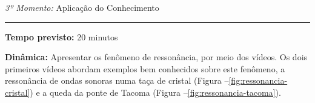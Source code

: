 
    \bigskip
    \noindent\emph{3º Momento:} Aplicação do Conhecimento
    \par\noindent\rule{.3\textwidth}{.5pt}  
    \par\noindent\textbf{Tempo previsto:} 20 minutos
    \smallskip
    \par\noindent\textbf{Dinâmica:} Apresentar os fenômeno de ressonância, por meio dos vídeos. Os dois primeiros vídeos abordam exemplos bem conhecidos sobre este fenômeno, a ressonância de ondas sonoras numa taça de cristal (Figura --\autoref{fig:ressonancia-cristal}) e a queda da ponte de Tacoma (Figura --\autoref{fig:ressonancia-tacoma}).

